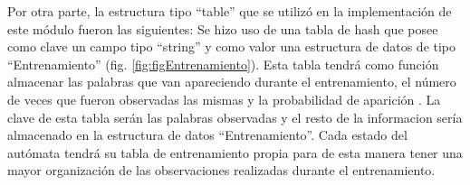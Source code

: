 Por otra parte, la estructura tipo ``table'' que se utilizó en la implementación de este módulo fueron las siguientes:
Se hizo uso de una tabla de hash que posee como clave un campo tipo
``string'' y como valor una estructura de datos de tipo ``Entrenamiento''
(fig. \ref{fig:figEntrenamiento}). Esta tabla tendrá como función almacenar las palabras que van apareciendo durante el entrenamiento, el número de veces que fueron observadas las mismas y la probabilidad de aparición . La clave de esta tabla serán las palabras observadas y el resto de la informacion sería almacenado en la estructura de datos ``Entrenamiento''.
Cada estado del autómata tendrá su tabla de entrenamiento propia para
de esta manera tener una mayor organización de las observaciones realizadas durante el entrenamiento.
